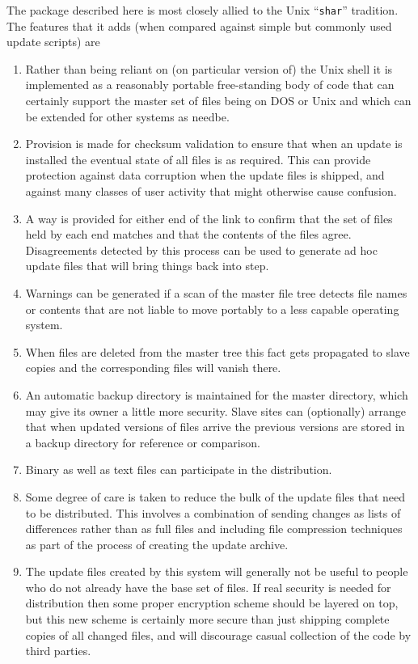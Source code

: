 The package described here is most closely allied to the Unix ``{\tt shar}''
tradition.  The features that it adds (when compared against simple but
commonly used update scripts) are
\begin{enumerate}
\item Rather than being reliant on (on particular version of) the Unix shell
it is implemented as a reasonably portable free-standing body of code that
can certainly support the master set of files being on DOS or Unix and which
can be extended for other systems as needbe.
\item Provision is made for checksum validation to ensure that when an
update is installed the eventual state of all files is as required. This
can provide protection against data corruption when the update files is
shipped, and against many classes of user activity that might otherwise
cause confusion.
\item A way is provided for either end of the link to confirm that the
set of files held by each end matches and that the contents of the files
agree. Disagreements detected by this process can be used to generate
ad hoc update files that will bring things back into step.
\item Warnings can be generated if a scan of the master file tree detects
file names or contents that are not liable to move portably to a less
capable operating system.
\item When files are deleted from the master tree this fact gets propagated
to slave copies and the corresponding files will vanish there.
\item An automatic backup directory is maintained for the master directory,
which may give its owner a little more security. Slave sites can (optionally)
arrange that when updated versions of files arrive the previous versions
are stored in a backup directory for reference or comparison.
\item Binary as well as text files can participate in the distribution.
\item Some degree of care is taken to reduce the bulk of the update files
that need to be distributed. This involves a combination of sending
changes as lists of differences rather than as full files and including
file compression techniques as part of the process of creating the update
archive.
\item The update files created by this system will generally not be
useful to people who do not already have the base set of files. If real
security is needed for distribution then some proper encryption scheme should
be layered on top, but this new scheme is certainly more secure than
just shipping complete copies of all changed files, and will discourage
casual collection of the code by third parties.
\end{enumerate}

